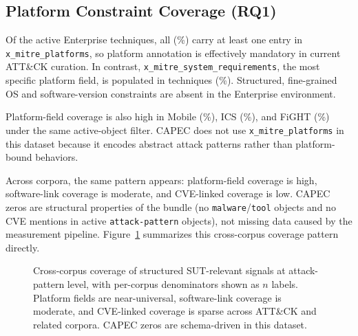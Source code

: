 \documentclass[sigconf,anonymous,review]{acmart}
\begin{document}
\subsection{Platform Constraint Coverage (RQ1)}

Of the \enterpriseplatformcount{} active Enterprise techniques, all \enterpriseplatformcount{} (\enterpriseplatformpct\%) carry at least one entry in \texttt{x\_mitre\_platforms}, so platform annotation is effectively mandatory in current ATT\&CK curation. In contrast, \texttt{x\_mitre\_system\_requirements}, the most specific platform field, is populated in \enterprisesystemrequirementscount{} techniques (\enterprisesystemrequirementspct\%). Structured, fine-grained OS and software-version constraints are absent in the Enterprise environment.

Platform-field coverage is also high in Mobile (\mobileplatformpct\%), ICS (\icsplatformpercentage\%), and FiGHT (\fightplatformpercentage\%) under the same active-object filter. CAPEC does not use \texttt{x\_mitre\_platforms} in this dataset because it encodes abstract attack patterns rather than platform-bound behaviors.

Across corpora, the same pattern appears: platform-field coverage is high, software-link coverage is moderate, and CVE-linked coverage is low. CAPEC zeros are structural properties of the bundle (no \texttt{malware}/\texttt{tool} objects and no CVE mentions in active \texttt{attack-pattern} objects), not missing data caused by the measurement pipeline. Figure~\ref{fig:coverage_cross_corpus} summarizes this cross-corpus coverage pattern directly.

\begin{figure}[!tb]
\centering
\resizebox{\columnwidth}{!}{}
\caption{\label{fig:coverage_cross_corpus}Cross-corpus coverage of structured SUT-relevant signals at attack-pattern level, with per-corpus denominators shown as $n$ labels. Platform fields are near-universal, software-link coverage is moderate, and CVE-linked coverage is sparse across ATT\&CK and related corpora. CAPEC zeros are schema-driven in this dataset.}
\end{figure}
\end{document}
